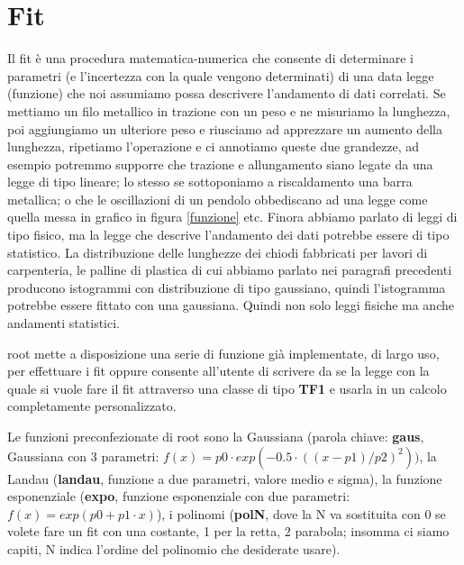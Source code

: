 \documentclass[11pt,fleqn]{book} %
\begin{document}
\section{Fit}

Il fit è una procedura matematica-numerica che consente di determinare i parametri (e l'incertezza con la quale vengono determinati) di una data legge (funzione) che noi assumiamo possa descrivere l'andamento di dati correlati. Se mettiamo un filo metallico in trazione con un peso e ne misuriamo la lunghezza, poi aggiungiamo un ulteriore peso e riusciamo ad apprezzare un aumento della lunghezza, ripetiamo l'operazione e ci annotiamo queste due grandezze, ad esempio potremmo supporre che trazione e allungamento siano legate da una legge di tipo lineare; lo stesso se sottoponiamo a riscaldamento una barra metallica; o che le oscillazioni di un pendolo obbediscano ad una legge come quella messa in grafico in figura \ref{funzione} etc. Finora abbiamo parlato di leggi di tipo fisico, ma la legge che descrive l'andamento dei dati potrebbe essere di tipo statistico. La distribuzione delle lunghezze dei chiodi fabbricati per lavori di carpenteria, le palline di plastica di cui abbiamo parlato nei paragrafi precedenti producono istogrammi con distribuzione di tipo gaussiano, quindi l'istogramma potrebbe essere fittato con una gaussiana. Quindi non solo leggi fisiche ma anche andamenti statistici.

root mette a disposizione una serie di funzione già implementate, di largo uso, per effettuare i fit oppure consente all'utente di scrivere da se la legge con la quale si vuole fare il fit attraverso una classe di tipo \textbf{TF1} e usarla in un calcolo completamente personalizzato.

Le funzioni preconfezionate di root sono la Gaussiana (parola chiave: \textbf{gaus}, Gaussiana con 3 parametri: $f(x) = p0\cdot exp(-0.5\cdot ((x-p1)/p2)^2))$, la Landau (\textbf{landau}, funzione a due parametri, valore medio e sigma), la funzione esponenziale (\textbf{expo}, funzione esponenziale con due parametri: $f(x) = exp(p0+p1\cdot x)$), i polinomi (\textbf{polN}, dove la N va sostituita con 0 se volete fare un fit con una costante, 1 per la retta, 2 parabola; insomma ci siamo capiti, N indica l'ordine del polinomio che desiderate usare).
\end{document}
